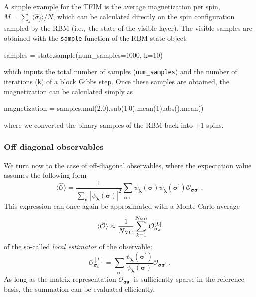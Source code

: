 \documentclass[submission, Phys, hidelnks]{SciPost}
\begin{document}
A simple example for the TFIM is the average magnetization per spin, $M=\sum_j\langle\hat{\sigma}_j\rangle/N$, which can be calculated directly on the spin configuration sampled by the RBM (i.e.,~the state of the visible layer). The visible samples are obtained with the \verb|sample| function of the RBM state object:
\begin{python}
samples = state.sample(num_samples=1000, k=10)
\end{python}
which inputs the total number of samples (\verb|num_samples|) and the number of iterations (\verb|k|) of a block Gibbs step. Once these samples are obtained, the magnetization can be calculated simply as
\begin{python}
magnetization = samples.mul(2.0).sub(1.0).mean(1).abs().mean()
\end{python}
where we converted the binary samples of the RBM back into $\pm 1$ spins.

\subsubsection{Off-diagonal observables}

We turn now to the case of off-diagonal observables, where the expectation value assumes the following form
\begin{equation}
    \langle \hat{\mathcal{O}} \rangle = \frac{1}{\sum_{\bm{\sigma}} |\psi_{\bm{\lambda}}(\bm{\sigma})|^2}
    \sum_{\bm{\sigma\sigma}^\prime} \psi_{\bm{\lambda}}(\bm{\sigma})
    \psi_{\bm{\lambda}}(\bm{\sigma}^\prime)\mathcal{O}_{\bm{\sigma\sigma}^\prime}\:.
\end{equation}
This expression can once again be approximated with a Monte Carlo average 
\begin{equation}
    \langle \hat{\mathcal{O}}\rangle \approx \frac{1}{N_{\rm MC}} \sum_{k=1}^{N_{\rm MC}} \mathcal{O}^{[L]}_{\bm{\sigma}_k}
\end{equation}
of the so-called \emph{local estimator} of the observable: 
\begin{equation}
    \mathcal{O}^{[L]}_{\bm{\sigma}_k}=\sum_{\bm{\sigma}^\prime}\frac{\psi_{\bm{\lambda}}(\bm{\sigma}^\prime)}{\psi_{\bm{\lambda}}(\bm{\sigma})} \mathcal{O}_{\bm{\sigma\sigma}^\prime}\:.
\end{equation}
As long as the matrix representation $\mathcal{O}_{\bm{\sigma\sigma}^\prime}$ is sufficiently sparse in the reference basis, the summation can be evaluated efficiently. 
\end{document}
